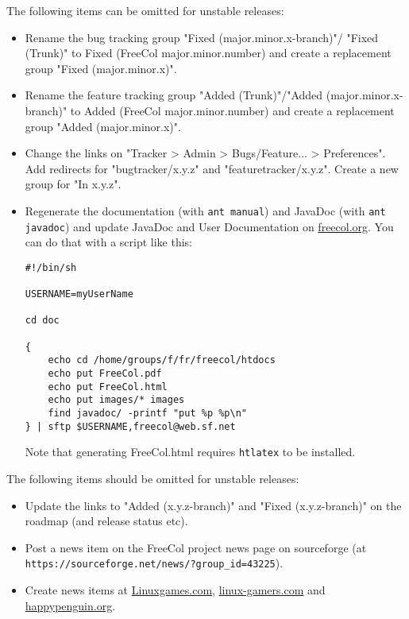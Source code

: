 \documentclass[12pt]{book}
\begin{document}
The following items can be omitted for unstable releases:

\begin{itemize}

\item Rename the bug tracking group "Fixed (major.minor.x-branch)"/
  "Fixed (Trunk)" to Fixed (FreeCol major.minor.number) and create a
  replacement group "Fixed (major.minor.x)".

\item Rename the feature tracking group "Added (Trunk)"/"Added
  (major.minor.x-branch)" to Added (FreeCol major.minor.number) and
  create a replacement group "Added (major.minor.x)".

\item Change the links on "Tracker > Admin > Bugs/Feature... >
  Preferences". Add redirects for "bugtracker/x.y.z" and
  "featuretracker/x.y.z". Create a new group for "In x.y.z".

\item Regenerate the documentation (with \verb+ant manual+) and
  JavaDoc (with \verb+ant javadoc+) and update JavaDoc and User
  Documentation on \href{freecol.org}{freecol.org}. You can do that
  with a script like this:

\begin{verbatim}
#!/bin/sh

USERNAME=myUserName

cd doc

{
    echo cd /home/groups/f/fr/freecol/htdocs
    echo put FreeCol.pdf
    echo put FreeCol.html
    echo put images/* images
    find javadoc/ -printf "put %p %p\n"
} | sftp $USERNAME,freecol@web.sf.net

\end{verbatim}

Note that generating FreeCol.html requires \verb+htlatex+
to be installed.


\end{itemize}

The following items should be omitted for unstable releases:

\begin{itemize}

\item Update the links to "Added (x.y.z-branch)" and "Fixed
  (x.y.z-branch)" on the roadmap (and release status etc).

\item Post a news item on the FreeCol project news page on sourceforge
(at \verb+https://sourceforge.net/news/?group_id=43225+).

\item Create news items at \href{Linuxgames.com}{Linuxgames.com},
  \href{linux-gamers.com}{linux-gamers.com} and
  \href{happypenguin.org}{happypenguin.org}.

\end{itemize}
\end{document}

